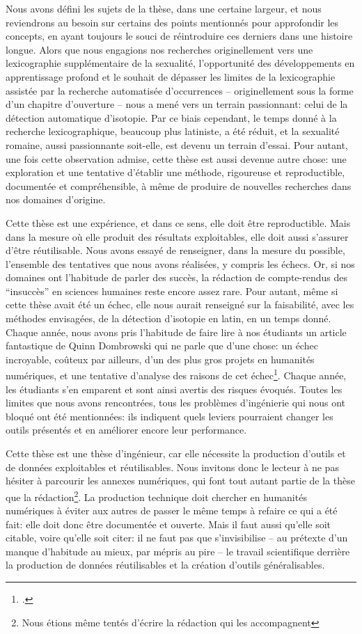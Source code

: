 Nous avons défini les sujets de la thèse, dans une certaine largeur, et nous reviendrons au besoin sur certains des points mentionnés pour approfondir les concepts, en ayant toujours le souci de réintroduire ces derniers dans une histoire longue. Alors que nous engagions nos recherches originellement vers une lexicographie supplémentaire de la sexualité, l'opportunité des développements en apprentissage profond et le souhait de dépasser les limites de la lexicographie assistée par la recherche automatisée d'occurrences -- originellement sous la forme d'un chapitre d'ouverture -- nous a mené vers un terrain passionnant: celui de la détection automatique d'isotopie. Par ce biais cependant, le temps donné à la recherche lexicographique, beaucoup plus latiniste, a été réduit, et la sexualité romaine, aussi passionnante soit-elle, est devenu un terrain d'essai. Pour autant, une fois cette observation admise, cette thèse est aussi devenue autre chose: une exploration et une tentative d'établir une méthode, rigoureuse et reproductible, documentée et compréhensible, à même de produire de nouvelles recherches dans nos domaines d'origine.

Cette thèse est une expérience, et dans ce sens, elle doit être reproductible. Mais dans la mesure où elle produit des résultats exploitables, elle doit aussi s'assurer d'être réutilisable. Nous avons essayé de renseigner, dans la mesure du possible, l'ensemble des tentatives que nous avons réalisées, y compris les échecs. Or, si nos domaines ont l'habitude de parler des succès, la rédaction de compte-rendus des \enquote{insuccès} en sciences humaines reste encore assez rare. Pour autant, même si cette thèse avait été un échec, elle nous aurait renseigné sur la faisabilité, avec les méthodes envisagées, de la détection d'isotopie en latin, en un temps donné. Chaque année, nous avons pris l'habitude de faire lire à nos étudiants un article fantastique de Quinn Dombrowski qui ne parle que d'une chose: un échec incroyable, coûteux par ailleurs, d'un des plus gros projets en humanités numériques, et une tentative d'analyse des raisons de cet échec\footcite{dombrowski2014ever}. Chaque année, les étudiants s'en emparent et sont ainsi avertis des risques évoqués. Toutes les limites que nous avons rencontrées, tous les problèmes d'ingénierie qui nous ont bloqué ont été mentionnées: ils indiquent quels leviers pourraient changer les outils présentés et en améliorer encore leur performance.

Cette thèse est une thèse d'ingénieur, car elle nécessite la production d'outils et de données exploitables et réutilisables. Nous invitons donc le lecteur à ne pas hésiter à parcourir les annexes numériques, qui font tout autant partie de la thèse que la rédaction\footnote{Nous étions même tentés d'écrire la rédaction qui les accompagnent}. La production technique doit chercher en humanités numériques à éviter aux autres de passer le même temps à refaire ce qui a été fait: elle doit donc être documentée et ouverte. Mais il faut aussi qu'elle soit citable, voire qu'elle soit citer: il ne faut pas que s'invisibilise -- au prétexte d'un manque d'habitude au mieux, par mépris au pire -- le travail scientifique derrière la production de données réutilisables et la création d'outils généralisables.

